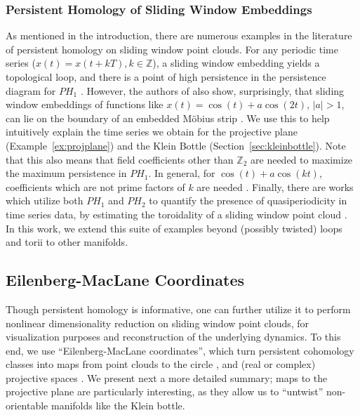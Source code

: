 \documentclass[11pt]{article}
\theoremstyle{definition}
\theoremstyle{remark}
\begin{document}
    \subsubsection{Persistent Homology of Sliding Window Embeddings}
    As mentioned in the introduction, there are numerous examples in the literature of persistent homology on sliding window point clouds.
    For any periodic time series ($x(t) = x(t + kT), k \in \mathbb{Z}$),
    a sliding window embedding yields a topological loop, and there is a point of high persistence in the persistence diagram for $PH_1$ \cite{perea2015sliding}.
    However, the authors of \cite{perea2015sliding} also show, surprisingly, that sliding window embeddings of functions like
    $x(t) = \cos(t) + a \cos(2t)$, $|a| > 1$, can lie on the boundary of an embedded M{\"o}bius strip \cite{perea2015sliding}.
    We use this to help intuitively explain the time series we obtain for the projective plane (Example~\ref{ex:projplane}) and the Klein Bottle
    (Section~\ref{sec:kleinbottle}).
    Note that this also means that field coefficients other than $\mathbb{Z}_2$ are needed to maximize the maximum persistence in $PH_1$.
    In general, for $\cos(t) + a \cos(kt)$, coefficients which are not prime factors of $k$ are needed \cite{perea2015sliding, traliemoebius}.
    Finally, there are works which utilize both $PH_1$ and $PH_2$ to quantify the presence of quasiperiodicity in time series data, by estimating 
    the toroidality of a sliding window point cloud \cite{perea2016persistent, tralie2017quasi}.
    In this work, we extend this suite of examples beyond (possibly twisted) loops and torii to  other manifolds.

    \subsection{Eilenberg-MacLane Coordinates}

    Though persistent homology is informative, one can further utilize it to perform nonlinear dimensionality reduction on  sliding window point clouds, for  visualization purposes and reconstruction of the underlying dynamics.  To this end, we use ``Eilenberg-MacLane coordinates'',  which turn persistent cohomology classes into maps from point clouds  to the circle \cite{de2011persistent,  perea2018circular}, and   (real or complex) projective spaces \cite{ perea2018multiscale}.  
    We present next a more detailed  summary;
    maps to the projective plane are particularly interesting, as they allow us to ``untwist'' non-orientable manifolds like the Klein bottle.
\end{document}
